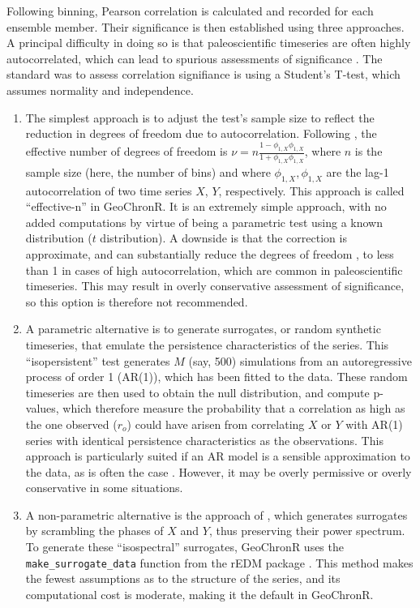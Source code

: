 \documentclass[gchron, manuscript]{copernicus}
\begin{document}
Following binning, Pearson correlation is calculated and recorded for each ensemble member. Their significance is then established using three approaches.
A principal difficulty in doing so is that paleoscientific timeseries are often highly autocorrelated, which can lead to spurious assessments of significance \citep{Hu_epsl17}.
The standard was to assess correlation signifiance is using a Student's T-test, which assumes normality and independence.

\begin{enumerate}
\def\labelenumi{\arabic{enumi}.}
\item
  The simplest approach is to adjust the test's sample size to reflect the reduction in degrees of freedom due to autocorrelation. Following \citet{bdawdy1964statistical}, the effective number of degrees of freedom is \(\nu = n \frac{1-\phi_{1,X}\phi_{1,X}}{1+\phi_{1,X}\phi_{1,X}}\), where \(n\) is the sample size (here, the number of bins) and where \(\phi_{1,X}, \phi_{1,X}\) are the lag-1 autocorrelation of two
  time series \(X\), \(Y\), respectively. This approach is called ``effective-n'' in GeoChronR. It is an extremely simple approach, with no added computations by virtue of being a parametric test using a known distribution (\(t\) distribution).
  A downside is that the correction is approximate, and can substantially reduce the degrees of freedom \citep{Hu_epsl17}, to less than 1 in cases of high autocorrelation, which are common in paleoscientific timeseries.
  This may result in overly conservative assessment of significance, so this option is therefore not recommended.
\item
  A parametric alternative is to generate surrogates, or random synthetic timeseries, that emulate the persistence characteristics of the series.
  This ``isopersistent'' test generates \(M\) (say, 500) simulations from an autoregressive process of order 1 (AR(1)), which has been fitted to the data.
  These random timeseries are then used to obtain the null distribution, and compute p-values, which therefore measure the probability that a correlation as high as the one observed (\(r_o\)) could have arisen from correlating \(X\) or \(Y\) with AR(1) series with identical persistence characteristics as the observations.
  This approach is particularly suited if an AR model is a sensible approximation to the data, as is often the case \citep{Ghil02}.
  However, it may be overly permissive or overly conservative in some situations.
\item
  A non-parametric alternative is the approach of \citet{Ebisuzaki_JClim97}, which generates surrogates by scrambling the phases of \(X\) and \(Y\), thus preserving their power spectrum.
  To generate these ``isospectral'' surrogates, GeoChronR uses the \texttt{make\_surrogate\_data} function from the rEDM package \citep{rEDM}.
  This method makes the fewest assumptions as to the structure of the series, and its computational cost is moderate, making it the default in GeoChronR.
\end{enumerate}
\end{document}
